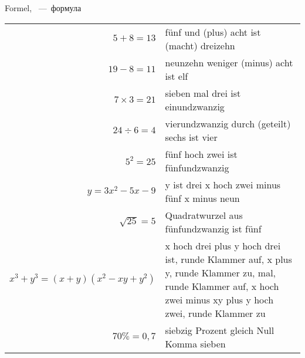 
 Formel, ~---~формула

\begin{tabular}{rp{7cm}}
$5 + 8 = 13$ & f\"unf und (plus) acht ist (macht) dreizehn \\
$19 - 8 = 11$ & neunzehn weniger (minus) acht ist elf \\
$7 \times 3 = 21$ & sieben mal drei ist einundzwanzig \\
$24 \div 6 = 4$ & vierundzwanzig durch (geteilt) sechs ist vier \\
$5^2 = 25$ & f\"unf hoch zwei ist fünfundzwanzig \\
$y = 3x^2 - 5x - 9$ & y ist drei x hoch zwei minus f\"unf x minus neun \\
$\sqrt{25} = 5$ & Quadratwurzel aus f\"unfundzwanzig ist f\"unf \\
$x^3 + y^3 = (x + y)(x^2 - xy + y^2)$ & x hoch drei plus y hoch drei ist, runde Klammer auf, x plus y, runde Klammer zu, mal, runde Klammer auf, x hoch zwei minus xy plus y hoch zwei, runde Klammer zu \\
$70\% = 0,7$ & siebzig Prozent gleich Null Komma sieben
\end{tabular}
